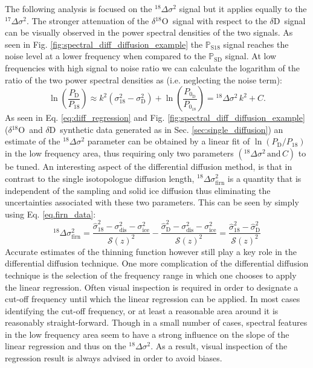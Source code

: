 \documentclass[11pt, draftcls, onecolumn]{IEEEtran} %
\numberwithin{equation}{section}
\numberwithin{table}{section}
\numberwithin{figure}{section}
\newcommand{\delOx}{$\delta{}^{18}\mathrm{O}$}
\newcommand{\delD}{$\delta\mathrm{D}$}
\begin{document}
The following analysis is focused on the ${}^{18}\Delta\sigma^2$ signal but it applies equally to 
the ${}^{17}\Delta\sigma^2$.
The stronger attenuation of the \delOx~signal with respect to the \delD~signal can be visually observed in the 
power spectral densities of the two signals. As seen in Fig. \ref{fig:spectral_diff_diffusion_example} the $\mathbb{P}_{\mathrm{S18}}$
signal reaches the noise level at a lower frequency when compared to the $\mathbb{P}_{\mathrm{SD}}$ signal.
At low frequencies  with high signal to noise ratio we can calculate the logarithm of the ratio of the two power spectral densities as
(i.e. neglecting the noise term):
\begin{equation} \label{eq:diff_regression}
\ln \left(\frac{P_\mathrm{D}}{P_{18}}\right) \approx k^2\left( \sigma^2_{18} - \sigma^2_{\mathrm{D}}\right) + 
\ln\left(\frac{P_{0_\mathrm{D}}}{P_{0_{18}}}\right) =
 {}^{18}\Delta \sigma^2\,k^2  + C.
\end{equation}
As seen in Eq. \ref{eq:diff_regression} and Fig. \ref{fig:spectral_diff_diffusion_example} 
(\delOx~and \delD~synthetic data generated as in Sec. \ref{sec:single_diffusion}) an estimate of the
${}^{18}\Delta\sigma^2$ parameter can be obtained by a linear fit of 
$\ln \left({P_\mathrm{D}}/{P_{18}}\right)$ in the low frequency area, 
thus requiring only two parameters $({}^{18}\Delta\sigma^2\mathrm{ \,and\, } C)$ to be tuned.
An interesting aspect of the differential diffusion method, is that in contrast to the single isotopologue diffusion length,
${}^{18}\Delta\sigma^2_\mathrm{firn}$ is a quantity that is independent of the sampling and solid ice diffusion thus eliminating the
uncertainties associated with these two parameters. This can be seen by simply using Eq. \ref{eq.firn_data}:
\begin{equation}
{}^{18}\Delta\sigma^2_{\mathrm{firn}} = \frac{\hat{\sigma}_{18}^2 - \sigma_{\mathrm{dis}}^2 - \sigma_{\mathrm{ice}}^2}{\mathcal{S}(z)^2} -  
\frac{\hat{\sigma}_\mathrm{D}^2 - 
	\sigma_{\mathrm{dis}}^2 - \sigma_{\mathrm{ice}}^2}{\mathcal{S}(z)^2} =  \frac{\hat{\sigma}_{18}^2 - 
	\hat{\sigma}_\mathrm{D}^2}{\mathcal{S}(z)^2}
\end{equation}
Accurate estimates of the thinning function however still play a key role in the differential diffusion technique.
One more complication of the differential diffusion technique is the selection of the frequency range in 
which one chooses to apply the linear regression. Often visual inspection is required in order to 
designate a cut-off frequency until which the linear regression can be applied. In most cases 
identifying the cut-off frequency, or at least a reasonable area around it is reasonably straight-forward.
Though in a small number of cases, spectral features in the low frequency area seem to have a strong 
influence on the slope of the linear regression and thus on the ${}^{18}\Delta\sigma^2$. As a result,
visual inspection of the regression result is always advised in order to avoid biases.
\end{document}
